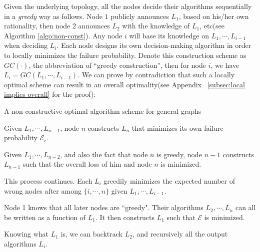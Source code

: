 \documentclass[a4paper,UKenglish]{lipics}
\theoremstyle{definition}
\begin{document}


Given the underlying topology, all the nodes decide their algorithms sequentially in a \emph{greedy} way as follows.
Node $1$ publicly announces $L_1$, based on his/her own rationality, then node 2 announces $L_2$ with the knowledge of $L_1$, etc(see Algorithm \ref{algo:non-const}). 
Any node $i$ will base its knowledge on $L_1, \dotsb, L_{i-1}$ when deciding $L_i$.
Each node designs its own decision-making algorithm in order to locally minimizes the failure probability.
Denote this construction scheme as $GC(\cdot)$, the abbreviation of ``greedy construction'', then for node $i$, we have $L_i = GC(L_1,\dotsb,L_{i-1})$.
We can prove by contradiction that such a locally optimal scheme can result in an overall optimality(see Appendix ~\ref{subsec:local implies overall} for the proof):


\begin{algorithm}[htb]
\caption{A non-constructive optimal algorithm scheme for general graphs}
\begin{algorithmic}[1]\label{algo:non-const}
\label{alg:greedy construction}
\STATE Given $L_1, \dotsb, L_{n-1}$, node $n$ constructs $L_n$ that minimizes its own failure probability $\mathcal{E}_i$.

\STATE Given $L_1, \dotsb, L_{n-2}$, and also the fact that node $n$ is greedy,
		 node $n - 1$ constructs $L_{n-1}$ such that the overall loss of him and node $n$ is minimized.

\STATE This process continues. Each $L_i$ greedily minimizes the expected number of wrong nodes after among $\{i, \dotsb, n\}$
		 given $L_1, \dotsb, L_{i-1}$. 

\STATE Node 1 knows that all later nodes are ``greedy".
	Their algorithms $L_2, \dotsb, L_n$ can all be written as a function of $L_1$. 
	It then constructs $L_1$ such that $\mathcal{E}$ is minimized.

\STATE Knowing what $L_1$ is, we can backtrack $L_2$, and recursively all the output algorithms $L_i$.
\end{algorithmic}
\end{algorithm}
\end{document}
